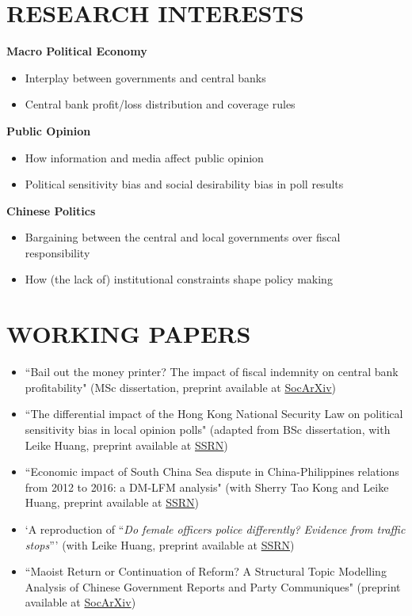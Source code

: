 \documentclass[a4paper,9pt]{extarticle}
\begin{document}
\section*{RESEARCH INTERESTS}
\noindent
\textbf{Macro Political Economy}
\begin{itemize}
    \item Interplay between governments and central banks
    \item Central bank profit/loss distribution and coverage rules
\end{itemize}
\noindent
\textbf
{Public Opinion}
\begin{itemize}
    \item How information and media affect public opinion
    \item Political sensitivity bias and social desirability bias in poll results
\end{itemize}
\noindent
\textbf{Chinese Politics}
\begin{itemize}
    \item Bargaining between the central and local governments over fiscal responsibility
    \item How (the lack of) institutional constraints shape policy making
\end{itemize}
\section*{WORKING PAPERS}
\begin{itemize}
    \item ``Bail out the money printer? The impact of fiscal indemnity on central bank profitability" (MSc dissertation, preprint available at \href{https://doi.org/10.31235/osf.io/wz75m}{SocArXiv})
    \item ``The differential impact of the Hong Kong National Security Law on political sensitivity bias in local opinion polls" (adapted from BSc dissertation, with Leike Huang, preprint available at \href{https://dx.doi.org/10.2139/ssrn.4499460}{SSRN})
    \item ``Economic impact of South China Sea dispute in China-Philippines relations from 2012 to 2016: a DM-LFM analysis" (with Sherry Tao Kong and Leike Huang, preprint available at \href{https://dx.doi.org/10.2139/ssrn.4623476}{SSRN})
    \item `A reproduction of ``\textit{Do female officers police differently? Evidence from traffic stops}”' (with Leike Huang, preprint available at \href{https://dx.doi.org/10.2139/ssrn.4632847}{SSRN})
    \item ``Maoist Return or Continuation of Reform? A Structural Topic Modelling Analysis of Chinese Government Reports and Party Communiques" (preprint available at \href{https://doi.org/10.31235/osf.io/62dvj}{SocArXiv})
\end{itemize}
\end{document}
